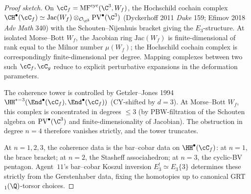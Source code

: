 \begin{proof}[Proof sketch]
On $\cC_f = \mathrm{MF}^{\mathrm{cyc}}(\C^3, W_f)$, the Hochschild
cochain complex
$\CH^\bullet(\cC_f) \simeq
 \mathrm{Jac}(W_f) \otimes_{\mathcal{O}_{\C^3}} \mathrm{PV}^\bullet(\C^3)$
(Dyckerhoff 2011 \emph{Duke} 159; Efimov 2018 \emph{Adv Math} 340)
with the Schouten--Nijenhuis bracket giving the $E_3$-structure.  At
isolated Morse--Bott $W_f$, the Jacobian ring $\mathrm{Jac}(W_f)$ is
finite-dimensional of rank equal to the Milnor number $\mu(W_f)$; the
Hochschild cochain complex is correspondingly finite-dimensional per
degree.  Mapping complexes between two such
$\cC_f, \cC_g$ reduce to explicit perturbative expansions in the
deformation parameters.

The coherence tower is controlled by Getzler--Jones 1994
$\HH^{*-3}(\End^\bullet(\cC_f), \End^\bullet(\cC_f))$ (CY-shifted by
$d = 3$).  At Morse--Bott $W_f$, this complex is concentrated in
degrees $\leq 3$ (by PBW-filtration of the Schouten algebra on
$\mathrm{PV}^\bullet(\C^3)$ and finite-dimensionality of Jacobian).
The obstruction in degree $n = 4$ therefore vanishes strictly, and the
tower truncates.

At $n = 1, 2, 3$, the coherence data is the bar--cobar data on
$\HH^\bullet(\cC_f)$: at $n=1$, the brace bracket; at $n=2$, the
Stasheff associahedron; at $n=3$, the cyclic-BV pentagon.  Agent~$11$'s
bar--cobar Koszul inversion $E_3^! \simeq E_3\{3\}$ determines these
strictly from the Gerstenhaber data, fixing the homotopies up to
canonical GRT$_1(\Q)$-torsor choices.
\end{proof}


